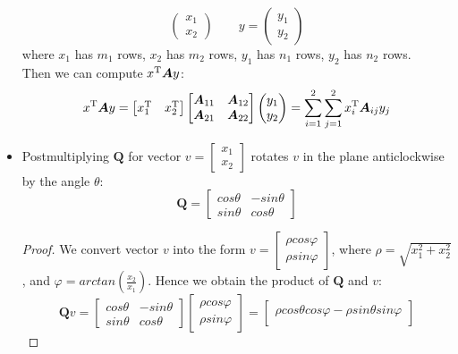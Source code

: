 \begin{itemize}
\[\begin{pmatrix}
x_1\\x_2
\end{pmatrix} \qquad y = \begin{pmatrix}
y_1\\y_2
\end{pmatrix}
\]
where $x_1$ has $m_1$ rows, $x_2$ has $m_2$ rows, $y_1$ has $n_1$ rows, $y_2$ has $n_2$ rows.\\
Then we can compute $x^{\mathrm T}\bm A y$:
\[
x^{\mathrm T}\bm A y = \begin{bmatrix}
x_1^{\mathrm T}&x_2^{\mathrm T}
\end{bmatrix}\begin{bmatrix}
\bm A_{11}&\bm A_{12}\\\bm A_{21}&\bm A_{22}
\end{bmatrix}\begin{pmatrix}
y_1\\y_2
\end{pmatrix} = \sum_{i=1}^{2}\sum_{j=1}^{2}x_{i}^{\mathrm T}\bm A_{ij} y_{j}
\]
\newpage
\item\begin{proposition}
Postmultiplying $\bm Q$ for vector $v = \begin{bmatrix}
x_1\\x_2
\end{bmatrix}$ rotates $v$ in the plane anticlockwise by the angle $\theta$:
\[
\bm Q = \begin{bmatrix}
cos\theta & -sin\theta \\ sin\theta & cos\theta
\end{bmatrix}
\]
\end{proposition}
\begin{proof}
We convert vector $v$ into the form $v = \begin{bmatrix}
\rho cos\varphi\\\rho sin\varphi
\end{bmatrix}$, where $\rho = \sqrt{x_1^2+x_2^2}$, and $\varphi = arctan(\frac{x_2}{x_1})$. Hence we obtain the product of $\bm Q$ and $v$:
\[
\bm Qv = \begin{bmatrix}
cos\theta & -sin\theta \\ sin\theta & cos\theta
\end{bmatrix}\begin{bmatrix}
\rho cos\varphi\\\rho sin\varphi
\end{bmatrix} = \begin{bmatrix}
\rho cos\theta cos\varphi - \rho sin\theta sin\varphi\\

\end{bmatrix}\]
\end{proof}
\end{itemize}
